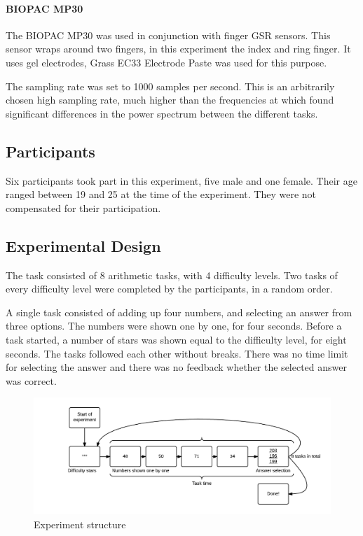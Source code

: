 \documentclass[11pt,leqno,a4paper]{report} %
\begin{document}
\paragraph{BIOPAC MP30}
The BIOPAC MP30 was used in conjunction with finger GSR sensors. This sensor wraps around two fingers, in this experiment the index and ring finger. It uses gel electrodes, Grass EC33 Electrode Paste was used for this purpose.

The sampling rate was set to 1000 samples per second. This is an arbitrarily chosen high sampling rate, much higher than the frequencies at which \citet{Nourbakhsh2012} found significant differences in the power spectrum between the different tasks.

\subsection{Participants}
Six participants took part in this experiment, five male and one female. Their age ranged between 19 and 25 at the time of the experiment. They were not compensated for their participation.


\subsection{Experimental Design}
The task consisted of 8 arithmetic tasks, with 4 difficulty levels. Two tasks of every difficulty level were completed by the participants, in a random order. 

A single task consisted of adding up four numbers, and selecting an answer from three options. The numbers were shown one by one, for four seconds. Before a task started, a number of stars was shown equal to the difficulty level, for eight seconds. The tasks followed each other without breaks. There was no time limit for selecting the answer and there was no feedback whether the selected answer was correct.

\begin{figure}[H]
  \centering
 	\hspace*{-.25\textwidth}   
 	\includegraphics[width=1.5\textwidth]{experiment.png}
  \caption{Experiment structure}
\end{figure}
\end{document}
